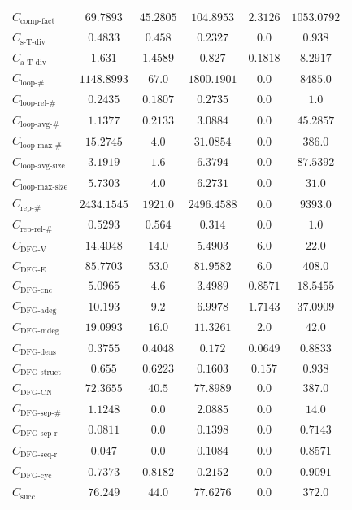 \documentclass{standalone}
\newcommand{\complexityfactorname}{\text{comp-fact}}
\newcommand{\complexityfactor}{C_{\complexityfactorname}}
\newcommand{\simpletracedivname}{\text{s-T-div}}
\newcommand{\simpletracediv}{C_{\simpletracedivname}}
\newcommand{\advtracedivname}{\text{a-T-div}}
\newcommand{\advtracediv}{C_{\advtracedivname}}
\newcommand{\loopnumname}{\text{loop-\#}}
\newcommand{\loopnum}{C_{\loopnumname}}
\newcommand{\looprelnumname}{\text{loop-rel-\#}}
\newcommand{\looprelnum}{C_{\looprelnumname}}
\newcommand{\loopavgname}{\text{loop-avg-\#}}
\newcommand{\loopavg}{C_{\loopavgname}}
\newcommand{\loopmaxname}{\text{loop-max-\#}}
\newcommand{\loopmax}{C_{\loopmaxname}}
\newcommand{\loopavgsizename}{\text{loop-avg-size}}
\newcommand{\loopavgsize}{C_{\loopavgsizename}}
\newcommand{\loopmaxsizename}{\text{loop-max-size}}
\newcommand{\loopmaxsize}{C_{\loopmaxsizename}}
\newcommand{\repnumname}{\text{rep-\#}}
\newcommand{\repnum}{C_{\repnumname}}
\newcommand{\reprelnumname}{\text{rep-rel-\#}}
\newcommand{\reprelnum}{C_{\reprelnumname}}
\newcommand{\dfgnodesname}{\text{DFG-V}}
\newcommand{\dfgnodes}{C_{\dfgnodesname}}
\newcommand{\dfgedgesname}{\text{DFG-E}}
\newcommand{\dfgedges}{C_{\dfgedgesname}}
\newcommand{\dfgcncname}{\text{DFG-cnc}}
\newcommand{\dfgcnc}{C_{\dfgcncname}}
\newcommand{\dfgavgdegname}{\text{DFG-adeg}}
\newcommand{\dfgavgdeg}{C_{\dfgavgdegname}}
\newcommand{\dfgmaxdegname}{\text{DFG-mdeg}}
\newcommand{\dfgmaxdeg}{C_{\dfgmaxdegname}}
\newcommand{\dfgdensname}{\text{DFG-dens}}
\newcommand{\dfgdens}{C_{\dfgdensname}}
\newcommand{\dfgstructname}{\text{DFG-struct}}
\newcommand{\dfgstruct}{C_{\dfgstructname}}
\newcommand{\dfgcycnumbername}{\text{DFG-CN}}
\newcommand{\dfgcycnumber}{C_{\dfgcycnumbername}}
\newcommand{\dfgsepnumname}{\text{DFG-sep-\#}}
\newcommand{\dfgsepnum}{C_{\dfgsepnumname}}
\newcommand{\dfgseprationame}{\text{DFG-sep-r}}
\newcommand{\dfgsepratio}{C_{\dfgseprationame}}
\newcommand{\dfgseqrationame}{\text{DFG-seq-r}}
\newcommand{\dfgseqratio}{C_{\dfgseqrationame}}
\newcommand{\dfgcycname}{\text{DFG-cyc}}
\newcommand{\dfgcyc}{C_{\dfgcycname}}
\newcommand{\numberofneighborhoodsname}{\text{succ}}
\newcommand{\numberofneighborhoods}{C_{\numberofneighborhoodsname}}
\begin{document}
\begin{tabular}{lccccc}
$\complexityfactor$ & $69.7893$ & $45.2805$ & $104.8953$ & $2.3126$ & $1053.0792$ \\ 
$\simpletracediv$ & $0.4833$ & $0.458$ & $0.2327$ & $0.0$ & $0.938$ \\ 
$\advtracediv$ & $1.631$ & $1.4589$ & $0.827$ & $0.1818$ & $8.2917$ \\ 
$\loopnum$ & $1148.8993$ & $67.0$ & $1800.1901$ & $0.0$ & $8485.0$ \\ 
$\looprelnum$ & $0.2435$ & $0.1807$ & $0.2735$ & $0.0$ & $1.0$ \\ 
$\loopavg$ & $1.1377$ & $0.2133$ & $3.0884$ & $0.0$ & $45.2857$ \\ 
$\loopmax$ & $15.2745$ & $4.0$ & $31.0854$ & $0.0$ & $386.0$ \\ 
$\loopavgsize$ & $3.1919$ & $1.6$ & $6.3794$ & $0.0$ & $87.5392$ \\ 
$\loopmaxsize$ & $5.7303$ & $4.0$ & $6.2731$ & $0.0$ & $31.0$ \\ 
$\repnum$ & $2434.1545$ & $1921.0$ & $2496.4588$ & $0.0$ & $9393.0$ \\ 
$\reprelnum$ & $0.5293$ & $0.564$ & $0.314$ & $0.0$ & $1.0$ \\ 
$\dfgnodes$ & $14.4048$ & $14.0$ & $5.4903$ & $6.0$ & $22.0$ \\ 
$\dfgedges$ & $85.7703$ & $53.0$ & $81.9582$ & $6.0$ & $408.0$ \\ 
$\dfgcnc$ & $5.0965$ & $4.6$ & $3.4989$ & $0.8571$ & $18.5455$ \\ 
$\dfgavgdeg$ & $10.193$ & $9.2$ & $6.9978$ & $1.7143$ & $37.0909$ \\ 
$\dfgmaxdeg$ & $19.0993$ & $16.0$ & $11.3261$ & $2.0$ & $42.0$ \\ 
$\dfgdens$ & $0.3755$ & $0.4048$ & $0.172$ & $0.0649$ & $0.8833$ \\ 
$\dfgstruct$ & $0.655$ & $0.6223$ & $0.1603$ & $0.157$ & $0.938$ \\ 
$\dfgcycnumber$ & $72.3655$ & $40.5$ & $77.8989$ & $0.0$ & $387.0$ \\ 
$\dfgsepnum$ & $1.1248$ & $0.0$ & $2.0885$ & $0.0$ & $14.0$ \\ 
$\dfgsepratio$ & $0.0811$ & $0.0$ & $0.1398$ & $0.0$ & $0.7143$ \\ 
$\dfgseqratio$ & $0.047$ & $0.0$ & $0.1084$ & $0.0$ & $0.8571$ \\ 
$\dfgcyc$ & $0.7373$ & $0.8182$ & $0.2152$ & $0.0$ & $0.9091$ \\ 
$\numberofneighborhoods$ & $76.249$ & $44.0$ & $77.6276$ & $0.0$ & $372.0$ \\ 

\end{tabular}
\end{document}
